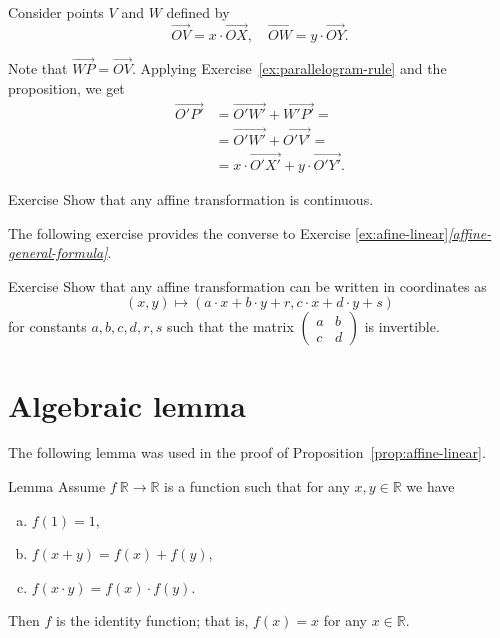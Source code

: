 Consider points $V$ and $W$ defined by
\[\overrightarrow{OV}=x\cdot\overrightarrow{OX},
\quad
\overrightarrow{OW}=y\cdot\overrightarrow{OY}.
\]

Note that 
$\overrightarrow{WP}=\overrightarrow{OV}$.
Applying Exercise~\ref{ex:parallelogram-rule} and the proposition, we get
\begin{align*}\overrightarrow{O'P'}&=\overrightarrow{O'W'}+\overrightarrow{W'P'}=
\\
&=\overrightarrow{O'W'}+\overrightarrow{O'V'}=
\\
&=x\cdot\overrightarrow{O'X'}+y\cdot\overrightarrow{O'Y'}.
\end{align*}
\qedsf


\begin{thm}{Exercise}\label{ex:affine-continuous}
Show that any affine transformation is continuous.
\end{thm}

The following exercise provides the converse to Exercise \ref{ex:afine-linear}\textit{\ref{affine-general-formula}}.

\begin{thm}{Exercise}\label{ex:affine-coordinates}
Show that any affine transformation can be written in coordinates as 
\[(x,y)\mapsto(a\cdot x+b\cdot y+r,c\cdot x+d\cdot y+s)\]
for constants $a,b,c,d,r,s$ such that the matrix $(\begin{smallmatrix}a&b\\c&d\end{smallmatrix})$ is invertible. 
\end{thm}


\section{Algebraic lemma}

The following lemma was used in the proof of Proposition~\ref{prop:affine-linear}.

\begin{thm}{Lemma}\label{lem:R-auto}
Assume $f\:\mathbb{R}\to\mathbb{R}$ is a function such that for any $x,y\in\mathbb{R}$ we have
\begin{enumerate}[(a)]
\item\label{lem:R-auto:a} $f(1)=1$,
\item\label{lem:R-auto:b} $f(x+y)=f(x)+f(y)$,
\item\label{lem:R-auto:c} $f(x\cdot y)=f(x)\cdot f(y)$.
\end{enumerate}

Then $f$ is the identity function; that is,
$f(x)=x$ for any $x\in \mathbb{R}$.
\end{thm}

